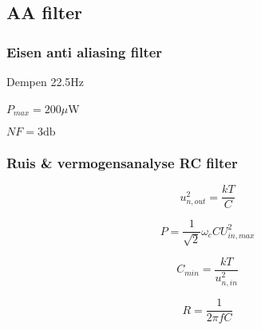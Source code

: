     \subsection*{AA filter}
    \begin{frame}
        \frametitle{Eisen anti aliasing filter}
        
        \centering

        Dempen 22.5Hz


        $P_{max}=200\mu$W


        $NF=3\si{\decibel}$
        \vspace{2cm}


        \pause

        \begin{figure}
            \centering
            \def\svgwidth{0.4\textwidth}
            
        \end{figure}
    
    \end{frame}
    \begin{frame}
        \frametitle{Ruis \& vermogensanalyse RC filter}
    
        \begin{equation}\label{eq:dividerNoise}
            u_{n,out}^2 = \frac{kT}{C}
        \end{equation}

        \begin{equation} \label{eq:filterPower}
            P = \frac{1}{\sqrt{2}}\omega_cCU_{in,max}^2
        \end{equation}

        \pause

        \begin{equation} \label{eq:filterCapMin}
            C_{min} = \frac{kT}{u_{n,in}^2}
        \end{equation}

        \begin{equation}
            R = \frac{1}{2\pi fC}
        \end{equation}
    
    \end{frame}
